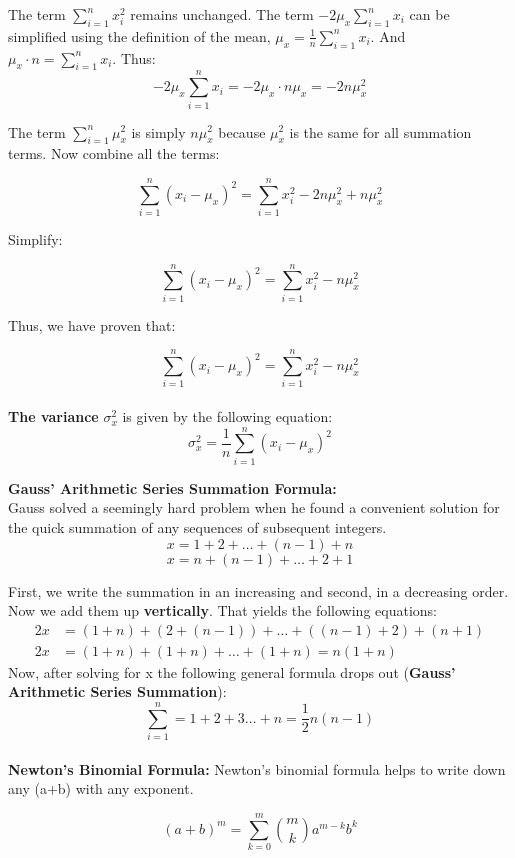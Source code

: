 \documentclass{article}
\begin{document}
The term \( \sum_{i=1}^{n} x_i^2 \) remains unchanged. The term \( -2\mu_x \sum_{i=1}^{n} x_i \) can be simplified using the definition of the mean, \( \mu_x = \frac{1}{n} \sum_{i=1}^{n} x_i \). And \( \mu_x \cdot n = \sum_{i=1}^{n} x_i \). Thus:
  \[
  -2\mu_x \sum_{i=1}^{n} x_i = -2\mu_x \cdot n \mu_x = -2n \mu_x^2
  \]
  
The term \( \sum_{i=1}^{n} \mu_x^2 \) is simply \( n \mu_x^2 \) because \( \mu_x^2 \) is the same for all summation terms. Now combine all the terms:

\[
\sum_{i=1}^{n} (x_i - \mu_x)^2 = \sum_{i=1}^{n} x_i^2 - 2n \mu_x^2 + n \mu_x^2
\]

Simplify:

\[
\sum_{i=1}^{n} (x_i - \mu_x)^2 = \sum_{i=1}^{n} x_i^2 - n \mu_x^2
\]

Thus, we have proven that:

\[
\sum_{i=1}^{n} (x_i - \mu_x)^2 = \sum_{i=1}^{n} x_i^2 - n \mu_x^2
\] \\
\textbf{The variance} \( \sigma_x^2 \) is given by the following equation:
\begin{equation}
    \sigma_x^2 = \frac{1}{n} \sum_{i=1}^{n} (x_i - \mu_x)^2
\end{equation} 

\vspace{1cm}

\textbf{Gauss' Arithmetic Series Summation Formula:}\\

Gauss solved a seemingly hard problem when he found a convenient solution for the quick summation of any sequences of subsequent integers. 
\[
x = 1 + 2 + \ldots + (n - 1) + n
\]
\[
x = n + (n - 1) + \ldots + 2 + 1
\]

First, we write the summation in an increasing and second, in a decreasing order. Now we add them up \textbf{vertically}. That yields the following equations: 
\begin{align*}
2x &= (1+n) + (2+(n-1)) + \ldots + ((n-1)+2) + (n+1) \\
2x &= (1 + n) + (1 + n) + \ldots + (1 + n) = n(1 + n)
\end{align*}
Now, after solving for x the following general formula drops out (\textbf{Gauss' Arithmetic Series Summation}): 
\begin{equation}
    \sum_{i=1}^{n} = 1 + 2 + 3 \ldots + n = \frac{1}{2}n(n - 1)
\end{equation} \\


\textbf{Newton's Binomial Formula:}
Newton's binomial formula helps to write down any (a+b) with any exponent. 

\begin{equation}
(a+b)^m = \sum_{k=0}^{m} \binom{m}{k} a^{m-k} b^{k}
\end{equation}
\end{document}
